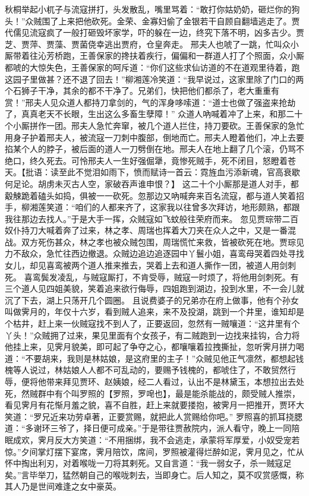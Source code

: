\documentclass[12pt,oneside]{book}
\begin{document}
秋桐举起小杌子与流寇拼打，头发散乱，嘴里骂着：“敢打你姑奶奶，砸烂你的狗头！”众贼围了上来把他砍死。金荣、金寡妇偷了金银若干自顾自翻墙逃走了。贾代儒见流寇疯了一般打砸毁坏家学，吓的躲在一边，终究下落不明，凶多吉少。贾芝、贾萍、贾藻、贾菌侥幸逃出贾府，仓皇奔走。
邢夫人也唬了一跳，忙叫众小厮带着往沁芳桥跑，王善保家的搀扶着疾行，偏偏和一群道人打了个照面，众小厮都唬的大惊失色，王善保家的呵斥道：“你们这些求仙访道的不在道观里待着，跑这园子里做甚？还不退了回去！”柳湘莲冷笑道：“我早说过，这家里除了门口的两个石狮子干净，其余的都不干净了。兄弟们，快把他们都杀了，老大重重有赏！”邢夫人见众道人都持刀拿剑的，气的浑身哆嗦道：“道士也做了强盗来抢劫了，真真老天不长眼，生出这么多畜生孽障！”
众道人吶喊着冲了上来，和那二十个小厮拼作一团。邢夫人急忙奔窜，被几个道人拦住，持刀要砍。王善保家的急忙用身子护着邢夫人，被流寇一刀刺中腹部，倒地而亡。邢夫人瞪着他们，冲上去要掐某个人的脖子，被后面的道人一刀劈倒在地。邢夫人在地上翻了几个滚，仍骂不绝口，终久死去。可怜邢夫人一生好强倔犟，竟惨死贼手，死不闭目，怒瞪着苍天。【批语：读至此不觉泪如雨下，愤而赋诗一首云：霓旌血污添新魂，官高衰歇何足论。胡虏未灭古人空，家破吞声谁申恨？】 
这二十个小厮那是道人对手，都觳觫跪着磕头如捣，俱被一一砍死。忽那边又吶喊奔来百名流寇，都与道人笑着招手，柳湘莲笑道：“咱们的人都来齐了，这家我以往曾多次拜访，地形颇熟，都跟我往那边去找人。”于是大手一挥，众贼寇如飞蚊般往荣府而来。
忽见贾琮带二百奴仆持刀大喊着奔了过来，林之孝、周瑞也挥着大刀夹在众人之中，又是一番混战。双方死伤甚众，林之孝也被众贼包围，周瑞慌忙来救，皆被砍死在地。贾琮见力不敌众，急忙往西边撤退。众贼边追边追逐园中丫鬟小姐，喜鸾母哭着四处寻找女儿，却见喜鸾被两个道人推来推去，哭着上去和道人撕作一团，被道人用剑刺死。
喜鸾鬓发凌乱，与贼寇厮打，不肯受辱，贼寇一时烦了，将他用剑刺死。有三个道人见四姐美貌，笑着追来欲行侮辱，四姐跑到湖边，投到水里，不一会儿就沉了下去，湖上只荡开几个圆圈。
且说费婆子的兄弟亦在府上做事，他有个孙女叫做霁月的，年仅十六岁，看到贼人追来，来不及投湖，跳到一个井里，谁知却是个枯井，赶上来一伙贼寇找不到人了，正要返回，忽然有一贼嚷道：“这井里有个丫头！”众贼拥了过来，果见里面有个女孩子，有二贼跑到一边找来挂钩，合力将他挂上来，见霁月貌美，即可起了争夺之心，都嚷嚷着拉拽撕扯，忽听霁月拼力喝道：“不要胡来，我则是林姑娘，是这府里的主子！”众贼见他正气凛然，都想起钱槐等人说过，林姑娘人人都不可乱动的，要赐予钱槐的，都唬住了，不敢贸然行辱，便将他带来拜见贾环、赵姨娘，经二人看过，认出不是林黛玉，本想拉出去处死，然贼群中有个叫罗照的【罗照，罗唣也】，最是能杀能战的，颇受贼人推崇，看见霁月有花惭月羞之貌，喜不自胜，赶上来就要搂抱，被霁月一把推开，贾环大笑道：“罗兄近来功劳卓著，正要赏赐，就把此人赏赐给你吧。”
罗照喜的抓耳挠腮道：“多谢环三爷了，择日便可成亲。”于是带往贾赦院内，派人看守，晚上一同陪眠成欢，霁月反大方笑道：“不用捆绑，我不会逃走，承蒙将军厚爱，小奴受宠若惊。”夕间掌灯摆下宴席，霁月陪饮，席间，罗照被灌得烂醉如泥，霁月见之，忙从怀中掏出利刃，对着喉咙一刀将其剌死。又自言道：“我一弱女子，杀一贼寇足矣。”言毕举刀，猛然朝自己的喉咙刺去，当即身亡。后人知之，莫不叹赏感慨，称其人乃是世间难逢之女中豪英。
\end{document}
